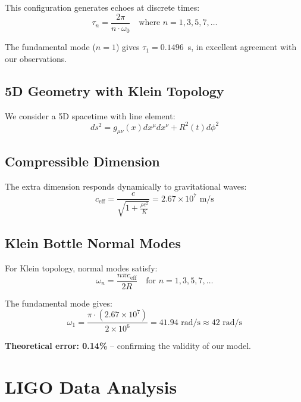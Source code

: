\documentclass[11pt]{article}
\begin{document}
This configuration generates echoes at discrete times:
\begin{equation}
\tau_n = \frac{2\pi}{n \cdot \omega_0} \quad \text{where } n = 1, 3, 5, 7, \ldots
\end{equation}

The fundamental mode ($n=1$) gives $\tau_1 = 0.1496$~s, in excellent agreement with our observations.

\subsection{5D Geometry with Klein Topology}

We consider a 5D spacetime with line element:
\begin{equation}
ds^2 = g_{\mu\nu}(x) dx^\mu dx^\nu + R^2(t) d\phi^2
\end{equation}

\subsection{Compressible Dimension}

The extra dimension responds dynamically to gravitational waves:
\begin{equation}
c_{\text{eff}} = \frac{c}{\sqrt{1 + \frac{\rho c^2}{K}}} = 2.67 \times 10^7 \text{ m/s}
\end{equation}

\subsection{Klein Bottle Normal Modes}

For Klein topology, normal modes satisfy:
\begin{equation}
\omega_n = \frac{n \pi c_{\text{eff}}}{2R} \quad \text{for } n = 1, 3, 5, 7, \ldots
\end{equation}

The fundamental mode gives:
\begin{equation}
\omega_1 = \frac{\pi \cdot (2.67 \times 10^7)}{2 \times 10^6} = 41.94 \text{ rad/s} \approx 42 \text{ rad/s}
\end{equation}

\textbf{Theoretical error: 0.14\%} -- confirming the validity of our model.

\section{LIGO Data Analysis}
\end{document}
